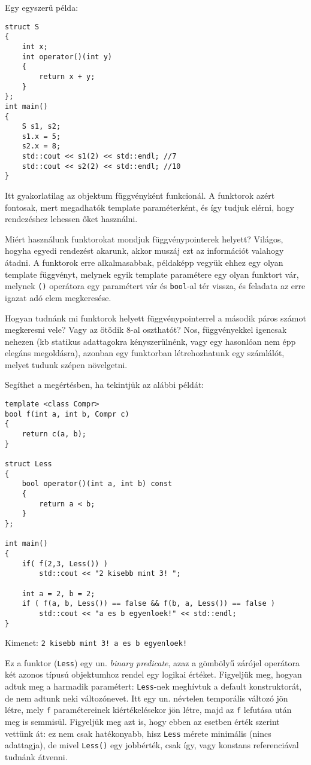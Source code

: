 \documentclass[a4paper,11.5pt]{article}
\begin{document}
	\smallskip
	Egy egyszerű példa:
	\begin{lstlisting}
struct S
{
	int x;
	int operator()(int y)
	{
		return x + y;
	}
};
int main()
{
	S s1, s2;
	s1.x = 5;
	s2.x = 8;
	std::cout << s1(2) << std::endl; //7
	std::cout << s2(2) << std::endl; //10
}
	\end{lstlisting}
	Itt gyakorlatilag az objektum függvényként funkcionál. A funktorok azért fontosak, mert megadhatók template paraméterként, és így tudjuk elérni, hogy rendezéshez lehessen őket használni.
	\begin{note}
	Miért használunk funktorokat mondjuk függvénypointerek helyett? Világos, hogyha egyedi rendezést akarunk, akkor muszáj ezt az információt valahogy átadni. A funktorok erre alkalmasabbak, példaképp vegyük ehhez egy olyan template függvényt, melynek egyik template paramétere egy olyan funktort vár, melynek \texttt{()} operátora egy paramétert vár és \texttt{bool}-al tér vissza, és feladata az erre igazat adó elem megkeresése. 
	
	Hogyan tudnánk mi funktorok helyett függvénypointerrel a második páros számot megkeresni vele? Vagy az ötödik 8-al oszthatót? Nos, függvényekkel igencsak nehezen (kb statikus adattagokra kényszerülnénk, vagy egy hasonlóan nem épp elegáns megoldásra), azonban egy funktorban létrehozhatunk egy számlálót, melyet tudunk szépen növelgetni.
	\end{note}
	
	Segíthet a megértésben, ha tekintjük az alábbi példát:
	\begin{lstlisting}
template <class Compr>
bool f(int a, int b, Compr c)
{
	return c(a, b);
}

struct Less
{
	bool operator()(int a, int b) const
	{
		return a < b;
	}
};

int main()
{
	if( f(2,3, Less()) )
		std::cout << "2 kisebb mint 3! ";
	
	int a = 2, b = 2;
	if ( f(a, b, Less()) == false && f(b, a, Less()) == false )
		std::cout << "a es b egyenloek!" << std::endl;
}
	\end{lstlisting}
	Kimenet: \texttt{2 kisebb mint 3! a es b egyenloek!}
	
	Ez a funktor (\texttt{Less}) egy un. \textit{binary predicate}, azaz a gömbölyű zárójel operátora két azonos típusú objektumhoz rendel egy logikai értéket. Figyeljük meg, hogyan adtuk meg a harmadik paramétert: \texttt{Less}-nek meghívtuk a default konstruktorát, de nem adtunk neki változónevet. Itt egy un. névtelen temporális változó jön létre, mely \texttt{f} paramétereinek kiértékelésekor jön létre, majd az \texttt{f} lefutása után meg is semmisül. Figyeljük meg azt is, hogy ebben az esetben érték szerint vettünk át: ez nem csak hatékonyabb, hisz \texttt{Less} mérete minimális (nincs adattagja), de mivel \texttt{Less()} egy jobbérték, csak így, vagy konstans referenciával tudnánk átvenni.
	\smallskip
	
\end{document}
